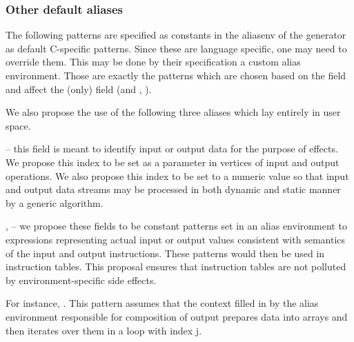 \subsubsection{Other default aliases}

The following patterns are specified as constants in the aliasenv of the generator as default C-specific patterns. Since these are language specific, one may need to override them. This may be done by their specification a custom alias environment. Those are exactly the patterns which are chosen based on the  field and affect the (only)  field (and , ).

\mybeginfig
\begin{description}
\item {}
\item {}
\item {}
\item {}
\item {}
\end{description}

We also propose the use of the following three aliases which lay entirely in user space.

\begin{description}
  \item {} -- this field is meant to identify input or output data for the purpose of effects. We propose this index to be set as a parameter in vertices of input and output operations. We also propose this index to be set to a numeric value so that input and output data streams may be processed in both dynamic and static manner by a generic algorithm.
  \item {},  -- we propose these fields to be constant patterns set in an alias environment to expressions representing actual input or output values consistent with semantics of the input and output instructions. These patterns would then be used in instruction tables. This proposal ensures that instruction tables are not polluted by environment-specific side effects. 

  For instance, . This pattern assumes that the context filled in by the alias environment responsible for composition of output prepares data into arrays and then iterates over them in a loop with index j. 
\end{description}


